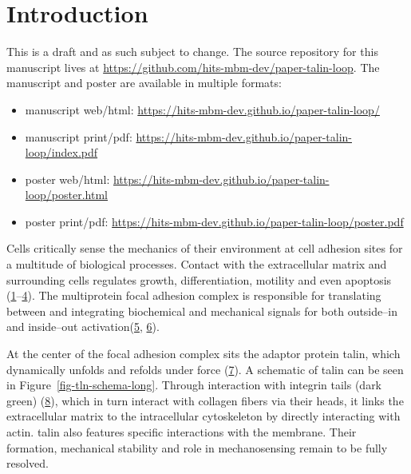\documentclass[
  twocolumn]{biophys-new-mod}
\providecommand{\tightlist}{%
  \setlength{\itemsep}{0pt}\setlength{\parskip}{0pt}}\usepackage{longtable,booktabs,array}
\begin{document}
\hypertarget{introduction}{%
\section{Introduction}\label{introduction}}

\begin{tcolorbox}[enhanced jigsaw, opacitybacktitle=0.6, opacityback=0, colback=white, coltitle=black, colbacktitle=quarto-callout-tip-color!10!white, breakable, bottomtitle=1mm, titlerule=0mm, toptitle=1mm, bottomrule=.15mm, left=2mm, rightrule=.15mm, title=\textcolor{quarto-callout-tip-color}{\faLightbulb}\hspace{0.5em}{Tip}, arc=.35mm, toprule=.15mm, leftrule=.75mm]

This is a draft and as such subject to change. The source repository for
this manuscript lives at
\url{https://github.com/hits-mbm-dev/paper-talin-loop}. The manuscript
and poster are available in multiple formats:

\begin{itemize}
\tightlist
\item
  manuscript web/html:
  \url{https://hits-mbm-dev.github.io/paper-talin-loop/}
\item
  manuscript print/pdf:
  \url{https://hits-mbm-dev.github.io/paper-talin-loop/index.pdf}
\item
  poster web/html:
  \url{https://hits-mbm-dev.github.io/paper-talin-loop/poster.html}
\item
  poster print/pdf:
  \url{https://hits-mbm-dev.github.io/paper-talin-loop/poster.pdf}
\end{itemize}

\end{tcolorbox}

Cells critically sense the mechanics of their environment at cell
adhesion sites for a multitude of biological processes. Contact with the
extracellular matrix and surrounding cells regulates growth,
differentiation, motility and even apoptosis
(\protect\hyperlink{ref-vogelLocalForceGeometry2006}{1}--\protect\hyperlink{ref-miroshnikovaAdhesionForcesCortical2018}{4}).
The multiprotein focal adhesion complex is responsible for translating
between and integrating biochemical and mechanical signals for both
outside--in and inside--out
activation(\protect\hyperlink{ref-thamilselvanPressureActivatesColon2004}{5},
\protect\hyperlink{ref-pelletierActivationStateIntegrin1995}{6}).

At the center of the focal adhesion complex sits the adaptor protein
talin, which dynamically unfolds and refolds under force
(\protect\hyperlink{ref-yaoMechanicalResponseTalin2016}{7}). A schematic
of talin can be seen in Figure~\ref{fig-tln-schema-long}. Through
interaction with integrin tails (dark green)
(\protect\hyperlink{ref-tadokoroTalinBindingIntegrin2003}{8}), which in
turn interact with collagen fibers via their heads, it links the
extracellular matrix to the intracellular cytoskeleton by directly
interacting with actin. talin also features specific interactions with
the membrane. Their formation, mechanical stability and role in
mechanosensing remain to be fully resolved.
\end{document}
